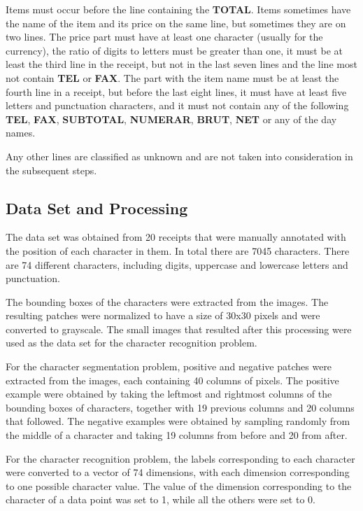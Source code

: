 Items must occur before the line containing the \textbf{TOTAL}. Items sometimes have the name of the item and its price on the same line, but sometimes they are on two lines. The price part must have at least one character (usually for the currency), the ratio of digits to letters must be greater than one, it must be at least the third line in the receipt, but not in the last seven lines and the line most not contain \textbf{TEL} or \textbf{FAX}. The part with the item name must be at least the fourth line in a receipt, but before the last eight lines, it must have at least five letters and punctuation characters, and it must not contain any of the following \textbf{TEL}, \textbf{FAX}, \textbf{SUBTOTAL}, \textbf{NUMERAR}, \textbf{BRUT}, \textbf{NET} or any of the day names. 

Any other lines are classified as unknown and are not taken into consideration in the subsequent steps.   

\subsection{Data Set and Processing}
The data set was obtained from 20 receipts that were manually annotated with the position of each character in them. In total there are 7045 characters. There are 74 different characters, including digits, uppercase and lowercase letters and punctuation. 

The bounding boxes of the characters were extracted from the images. The resulting patches were normalized to have a size of 30x30 pixels and were converted to grayscale. The small images that resulted after this processing were used as the data set for the character recognition problem.

For the character segmentation problem, positive and negative patches were extracted from the images, each containing 40 columns of pixels. The positive example were obtained by taking the leftmost and rightmost columns of the bounding boxes of characters, together with 19 previous columns and 20 columns that followed. The negative examples were obtained by sampling randomly from the middle of a character and taking 19 columns from before and 20 from after.

For the character recognition problem, the labels corresponding to each character were converted to a vector of 74 dimensions, with each dimension corresponding to one possible character value. The value of the dimension corresponding to the character of a data point was set to 1, while all the others were set to 0. 

